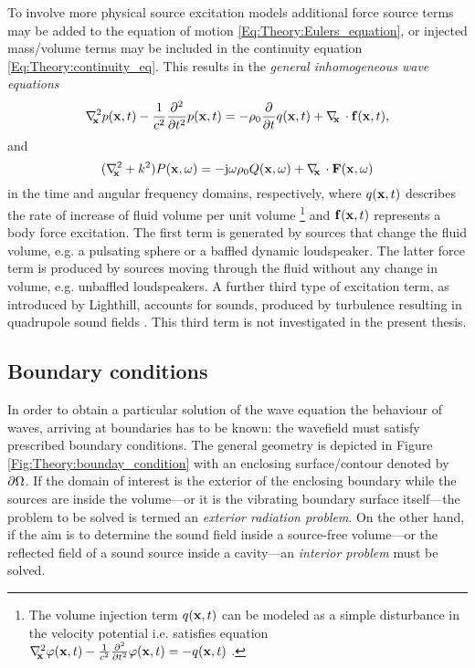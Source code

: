 To involve more physical source excitation models additional force source terms may be added to the equation of motion \eqref{Eq:Theory:Eulers_equation}, or injected mass/volume terms may be included in the continuity equation \eqref{Eq:Theory:continuity_eq}.
This results in the \emph{general inhomogeneous wave equations} \cite{Pierce1991, Kinsler2000, Howe2007}
\begin{equation}
\nabla^2_{\!\!\mathbf{x}} p(\mathbf{x},t) -\frac{1}{c^2}\frac{\partial^2}{\partial t^2}p(\mathbf{x},t) = - \rho_0 \frac{\partial}{\partial t} q(\mathbf{x},t) + \nabla_{\!\!\mathbf{x}}\, \cdot \mathbf{f}(\mathbf{x},t),
\label{Eq:Theory:Inhomogene_wave_eq_time_domain}
\end{equation}
and
\begin{equation}
(\nabla^2_{\!\!\mathbf{x}} + k^2 ) P(\mathbf{x},\omega ) = - \mathrm{j} \omega \rho_0 Q(\mathbf{x},\omega) + \nabla_{\!\!\mathbf{x}}\, \cdot \mathbf{F}(\mathbf{x},\omega)
\label{Eq:Theory:Inhomogene_wave_eq_freq_domain}
\end{equation}
in the time and angular frequency domains, respectively, where $q(\mathbf{x},t)$ describes the rate of increase of fluid volume per unit volume 
\footnote{The volume injection term $q(\mathbf{x},t)$ can be modeled as a simple disturbance in the velocity potential i.e. satisfies equation $\nabla^2_{\!\!\mathbf{x}} \varphi(\mathbf{x},t) -\frac{1}{c^2}\frac{\partial^2}{\partial t^2}\varphi(\mathbf{x},t) = -q(\mathbf{x},t)$ \cite{Jensen2007}.}
and $\mathbf{f}(\mathbf{x},t)$ represents a body force excitation.
The first term is generated by sources that change the fluid volume, e.g. a pulsating sphere or a baffled dynamic loudspeaker.
The latter force term is produced by sources moving through the fluid without any change in volume, e.g. unbaffled loudspeakers.
A further third type of excitation term, as introduced by Lighthill, accounts for sounds, produced by turbulence resulting in quadrupole sound fields \cite{Lighthill1952, Lighthill1954, Kinsler2000}.
This third term is not investigated in the present thesis.

\subsection{Boundary conditions}
\label{Section:Theory:Boundary_conditions}

In order to obtain a particular solution of the wave equation the behaviour of waves, arriving at boundaries has to be known: the wavefield must satisfy prescribed boundary conditions.
The general geometry is depicted in Figure \ref{Fig:Theory:bounday_condition} with an enclosing surface/contour denoted by $\partial \Omega$.
If the domain of interest is the exterior of the enclosing boundary while the sources are inside the volume---or it is the vibrating boundary surface itself---the problem to be solved is termed an \emph{exterior radiation problem}. 
On the other hand, if the aim is to determine the sound field inside a source-free volume---or the reflected field of a sound source inside a cavity---an \emph{interior problem} must be solved.

